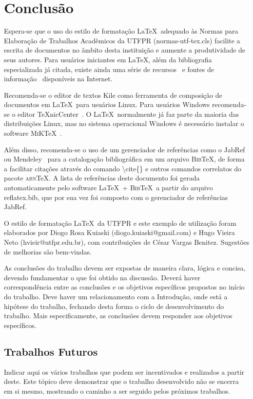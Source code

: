 \chapter{Conclus\~ao}
\label{chap:concl}

Espera-se que o uso do estilo de formata\c{c}\~ao \LaTeX\ adequado \`as Normas para Elabora\c{c}\~ao de Trabalhos Acad\^emicos da UTFPR ({\ttfamily normas-utf-tex.cls}) facilite a escrita de documentos no \^ambito desta institui\c{c}\~ao e aumente a produtividade de seus autores. Para usu\'arios iniciantes em \LaTeX, al\'em da bibliografia especializada j\'a citada, existe ainda uma s\'erie de recursos~\cite{CTAN2009} e fontes de informa\c{c}\~ao~\cite{TeX-Br2009,Wikibooks2009} dispon\'iveis na Internet.

Recomenda-se o editor de textos Kile como ferramenta de composi\c{c}\~ao de documentos em \LaTeX\ para usu\'arios Linux. Para usu\'arios Windows recomenda-se o editor \TeX nicCenter~\cite{TeXnicCenter2009}. O \LaTeX\ normalmente j\'a faz parte da maioria das distribui\c{c}\~oes Linux, mas no sistema operacional Windows \'e necess\'ario instalar o software \textsc{MiK}\TeX~\cite{MiKTeX2009}.

Al\'em disso, recomenda-se o uso de um gerenciador de refer\^encias como o JabRef~\cite{JabRef2009} ou Mendeley~\cite{Mendeley2009} para a cataloga\c{c}\~ao bibliogr\'afica em um arquivo \textsc{Bib}\TeX, de forma a facilitar cita\c{c}\~oes atrav\'es do comando {\ttfamily \textbackslash cite\{\}} e outros comandos correlatos do pacote \textsc{abn}\TeX. A lista de refer\^encias deste documento foi gerada automaticamente pelo software \LaTeX\ + \textsc{Bib}\TeX\ a partir do arquivo {\ttfamily reflatex.bib}, que por sua vez foi composto com o gerenciador de refer\^encias JabRef.

O estilo de formata\c{c}\~ao \LaTeX\ da UTFPR e este exemplo de utiliza\c{c}\~ao foram elaborados por Diogo Rosa Kuiaski (diogo.kuiaski@gmail.com) e Hugo Vieira Neto (hvieir@utfpr.edu.br), com contribui\c{c}\~oes de C\'esar Vargas Benitez. Sugest\~oes de melhorias s\~ao bem-vindas.

As conclusões do trabalho devem ser expostas de maneira clara, lógica e concisa, devendo fundamentar o que foi obtido na discussão. Deverá haver correspondência entre as conclusões e os objetivos específicos propostos no início do trabalho.
Deve haver um relacionamento com a Introdução, onde está a hipótese do trabalho, fechando desta forma o ciclo de desenvolvimento do trabalho. Mais especificamente, as conclusões devem responder aos objetivos específicos.

\section{Trabalhos Futuros}
Indicar aqui os vários trabalhos que podem ser incentivados e realizados a partir deste. Este tópico deve demonstrar que o trabalho desenvolvido não se encerra em si mesmo, mostrando o caminho a ser seguido pelos próximos trabalhos.
